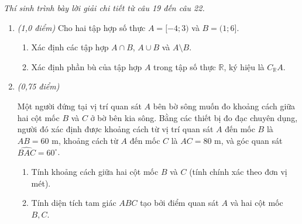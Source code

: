 \documentclass[12pt,a4paper]{article}
\newcommand{\parttitle}[1]{\par\vspace{2pt}{\large\bfseries\color{ink}#1}\par\vspace{1pt}}
\begin{document}
\parttitle{PHẦN IV. Tự luận}
\textit{Thí sinh trình bày lời giải chi tiết từ câu 19 đến câu 22.}
\begin{enumerate}[resume]
\item \textit{(1,0 điểm)} Cho hai tập hợp số thực $A = [-4; 3)$ và $B = (1; 6]$.
\begin{enumerate}
    \item Xác định các tập hợp $A \cap B$, $A \cup B$ và $A \setminus B$.
    \item Xác định phần bù của tập hợp $A$ trong tập số thực $\mathbb{R}$, ký hiệu là $C_\mathbb{R} A$.
\end{enumerate}

\item \textit{(0,75 điểm)}\par\vspace{1pt}
\begin{minipage}[t]{0.58\linewidth}
Một người đứng tại vị trí quan sát $A$ bên bờ sông muốn đo khoảng cách giữa hai cột mốc $B$ và $C$ ở bờ bên kia sông. Bằng các thiết bị đo đạc chuyên dụng, người đó xác định được khoảng cách từ vị trí quan sát $A$ đến mốc $B$ là $AB = 60\text{ m}$, khoảng cách từ $A$ đến mốc $C$ là $AC = 80\text{ m}$, và góc quan sát $\widehat{BAC} = 60^\circ$.
\begin{enumerate}
    \item Tính khoảng cách giữa hai cột mốc $B$ và $C$ (tính chính xác theo đơn vị mét).
    \item Tính diện tích tam giác $ABC$ tạo bởi điểm quan sát $A$ và hai cột mốc $B, C$.
\end{enumerate}
\end{minipage}%
\hfill
\begin{minipage}[t]{0.38\linewidth}
\centering
{}
\end{minipage}
\end{enumerate}
\end{document}
